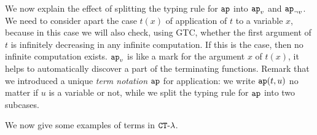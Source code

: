 
\begin{remark}
  We now explain the effect of splitting the typing rule for ${\tt ap}$ into 
  $\apvar$ and $\apnotvar$.
We need to consider apart the case $t(x)$ of application of $t$ to a variable
$x$, because in this case we will also check, using GTC, 
whether the first argument of $t$ is infinitely decreasing in any infinite 
computation. If this is the case, then no infinite computation exists. $\apvar$ is like 
a mark  for the argument $x$ of $t(x)$,
it helps to automatically discover a part of the terminating functions.
Remark that we introduced a unique \emph{term notation ${\tt ap}$} for application: 
we write ${\tt ap}(t,u)$ no matter if $u$ is a variable or not, while we split 
the typing rule for ${\tt ap}$ into two subcases. 
\end{remark}

We now give some examples of terms in ${ {\tt CT}\mbox{-}\lambda}$. 



